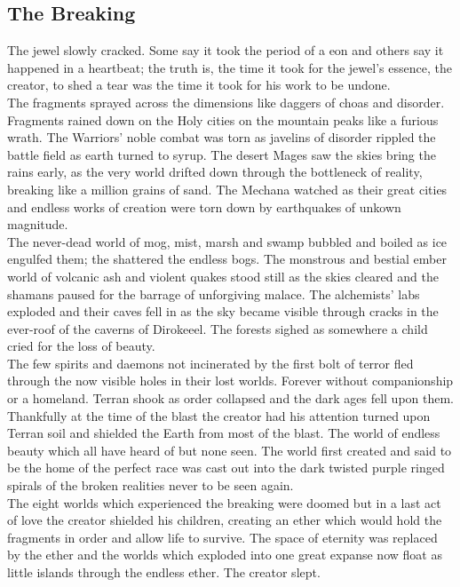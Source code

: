 \documentclass[a4paper,twocolumn]{article}
\begin{document}
\subsection{The Breaking}

The jewel slowly cracked. Some say it took the period of a eon and others say it happened in a heartbeat; the truth is, the time it took for the jewel's essence, the creator, to shed a tear was the time it took for his work to be undone.\\
The fragments sprayed across the dimensions like daggers of choas and disorder. Fragments rained down on the Holy cities on the mountain peaks like a furious wrath. The Warriors' noble combat was torn as javelins of disorder rippled the battle field as earth turned to syrup. The desert Mages saw the skies bring the rains early, as the very world drifted down through the bottleneck of reality, breaking like a million grains of sand. The Mechana watched as their great cities and endless works of creation were torn down by earthquakes of unkown magnitude.\\
The never-dead world of mog, mist, marsh and swamp bubbled and boiled as ice engulfed them; the shattered the endless bogs. The monstrous and bestial ember world of volcanic ash and violent quakes stood still as the skies cleared and the shamans paused for the barrage of unforgiving malace. The alchemists' labs exploded and their caves fell in as the sky became visible through cracks in the ever-roof of the caverns of Dirokeeel. The forests sighed as somewhere a child cried for the loss of beauty.\\
The few spirits and daemons not incinerated by the first bolt of terror fled through the now visible holes in their lost worlds. Forever without companionship or a homeland. Terran shook as order collapsed and the dark ages fell upon them. Thankfully at the time of the blast the creator had his attention turned upon Terran soil and shielded the Earth from most of the blast. The world of endless beauty which all have heard of but none seen. The world first created and said to be the home of the perfect race was cast out into the dark twisted purple ringed spirals of the broken realities never to be seen again.\\
The eight worlds which experienced the breaking were doomed but in a last act of love the creator shielded his children, creating an ether which would hold the fragments in order and allow life to survive. The space of eternity was replaced by the ether and the worlds which exploded into one great expanse now float as little islands through the endless ether. The creator slept.
\end{document}
